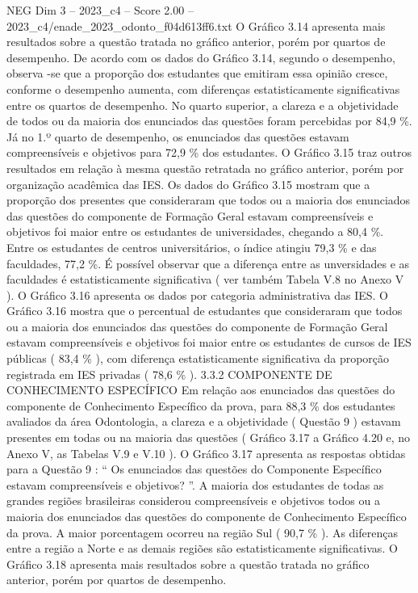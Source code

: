 \begin{textsample}{NEG Dim 3 – 2023\_c4 – Score 2.00 – 2023\_c4/enade\_2023\_odonto\_f04d613ff6.txt}
O Gráfico 3.14 apresenta mais resultados sobre a questão tratada no gráfico anterior, porém por quartos de desempenho.
De acordo com os dados do Gráfico 3.14, segundo o desempenho, observa -se que a proporção dos estudantes que emitiram essa opinião cresce, conforme o desempenho aumenta, com diferenças estatisticamente significativas entre os quartos de desempenho.
No quarto superior, a clareza e a objetividade de todos ou da maioria dos enunciados das questões foram percebidas por 84,9 \%.
Já no 1.º quarto de desempenho, os enunciados das questões estavam compreensíveis e objetivos para 72,9 \% dos estudantes.
O Gráfico 3.15 traz outros resultados em relação à mesma questão retratada no gráfico anterior, porém por organização acadêmica das IES.
Os dados do Gráfico 3.15 mostram que a proporção dos presentes que consideraram que todos ou a maioria dos enunciados das questões do componente de Formação Geral estavam compreensíveis e objetivos foi maior entre os estudantes de universidades, chegando a 80,4 \%.
Entre os estudantes de centros universitários, o índice atingiu 79,3 \% e das faculdades, 77,2 \%.
É possível observar que a diferença entre as unversidades e as faculdades é estatisticamente significativa ( ver também Tabela V.8 no Anexo V ).
O Gráfico 3.16 apresenta os dados por categoria administrativa das IES.
O Gráfico 3.16 mostra que o percentual de estudantes que consideraram que todos ou a maioria dos enunciados das questões do componente de Formação Geral estavam compreensíveis e objetivos foi maior entre os estudantes de cursos de IES públicas ( 83,4 \% ), com diferença estatisticamente significativa da proporção registrada em IES privadas ( 78,6 \% ). 3.3.2 COMPONENTE DE CONHECIMENTO ESPECÍFICO Em relação aos enunciados das questões do componente de Conhecimento Específico da prova, para 88,3 \% dos estudantes avaliados da área Odontologia, a clareza e a objetividade ( Questão 9 ) estavam presentes em todas ou na maioria das questões ( Gráfico 3.17 a Gráfico 4.20 e, no Anexo V, as Tabelas V.9 e V.10 ).
O Gráfico 3.17 apresenta as respostas obtidas para a Questão 9 : “ Os enunciados das questões do Componente Específico estavam compreensíveis e objetivos? ”.
A maioria dos estudantes de todas as grandes regiões brasileiras considerou compreensíveis e objetivos todos ou a maioria dos enunciados das questões do componente de Conhecimento Específico da prova.
A maior porcentagem ocorreu na região Sul ( 90,7 \% ).
As diferenças entre a região a Norte e as demais regiões são estatisticamente significativas.
O Gráfico 3.18 apresenta mais resultados sobre a questão tratada no gráfico anterior, porém por quartos de desempenho.

\end{textsample}
